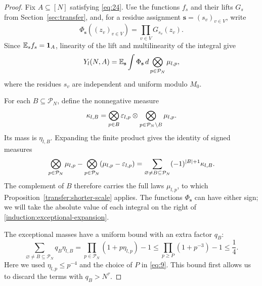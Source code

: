 \begin{proof}
Fix $A\subseteq[N]$ satisfying \eqref{eq:24}.  Use the functions $f_s$ and
their lifts $G_s$ from Section~\ref{sec:transfer}, and, for a residue
assignment $\mathbf s=(s_v)_{v\in V}$, write
\[
 \Phi_{\mathbf s}((z_v)_{v\in V})=\prod_{v\in V}G_{s_v}(z_v).
\]
Since $\mathbb E_s f_s=\mathbf 1_A$, linearity of the lift and multilinearity of the
integral give
\begin{equation}
 Y_l(N,A)=\mathbb E_{\mathbf s}
   \int\Phi_{\mathbf s}\,d\bigotimes_{p\in\mathcal P_N}\mu_{l,p},
 \label{induction:residue-average}
\end{equation}
where the residues $s_v$ are independent and uniform modulo $M_0$.

For each $B\subseteq\mathcal P_N$, define the nonnegative measure
\[
 \kappa_{l,B}=
   \bigotimes_{p\in B}\varepsilon_{l,p}
   \otimes\bigotimes_{p\in\mathcal P_N\setminus B}\mu_{l,p}.
\]
Its mass is $\eta_{l,B}$.  Expanding the finite product gives the identity
of signed measures
\begin{equation}
 \bigotimes_{p\in\mathcal P_N}\mu_{l,p}
 -\bigotimes_{p\in\mathcal P_N}(\mu_{l,p}-\varepsilon_{l,p})
 =\sum_{\varnothing\ne B\subseteq\mathcal P_N}
      (-1)^{|B|+1}\kappa_{l,B}.
 \label{induction:exceptional-expansion}
\end{equation}
The complement of $B$ therefore carries the full laws $\mu_{l,p}$, to
which Proposition~\ref{transfer:shorter-scale} applies.  The functions
$\Phi_{\mathbf s}$ can have either sign; we will take the absolute value
of each integral on the right of
\eqref{induction:exceptional-expansion}.

The exceptional masses have a uniform bound with an extra factor $q_B$:
\begin{equation}
 \sum_{\varnothing\ne B\subseteq\mathcal P_N}q_B\eta_{l,B}
 =\prod_{p\in\mathcal P_N}(1+p\eta_{l,p})-1
 \le\prod_{p\ge P}(1+p^{-3})-1\le\frac14.
 \label{eq:32}
\end{equation}
Here we used $\eta_{l,p}\le p^{-4}$ and the choice of $P$ in
\eqref{eq:9}.  This bound first allows us to discard the terms with
$q_B>N^\tau$.


\end{proof}
